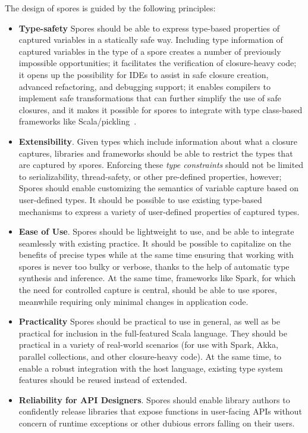 \documentclass{llncs}
\begin{document}
The design of spores is guided by the following principles:
\begin{itemize}
\item {\bf Type-safety} Spores should be able to express type-based
properties of captured variables in a statically safe way. Including type
information of captured variables in the type of a spore creates a number of
previously impossible opportunities; it facilitates the verification of
closure-heavy code; it opens up the possibility for IDEs to assist in safe
closure creation, advanced refactoring, and debugging support; it enables
compilers to implement safe transformations that can further simplify the use
of safe closures, and it makes it possible for spores to integrate with type
class-based frameworks like Scala/pickling~\cite{ScalaPickling}.

\item {\bf Extensibility}. Given types which include information about what  a
closure captures, libraries and frameworks should be able to restrict the
types that are captured by spores. Enforcing these {\em type constraints}
should not be limited to serializability, thread-safety, or other pre-defined
properties, however; Spores should enable customizing the semantics of
variable capture based on user-defined types. It should be possible to use
existing type-based mechanisms to express a variety of user-defined properties
of captured types.

\item {\bf Ease of Use}. Spores should be lightweight
to use, and be able to integrate seamlessly with existing practice. It should
be possible to capitalize on the benefits of precise types while at the same
time ensuring that working with spores is never too bulky or verbose, thanks
to the help of automatic type synthesis and inference. At the same time,
frameworks like Spark, for which the need for controlled capture is central,
should be able to use spores, meanwhile requiring only minimal changes in
application code.

\item {\bf Practicality} Spores should be practical to use in general, as
well as be practical for inclusion in the full-featured Scala language. They
should be practical in a variety of real-world scenarios (for use with Spark,
Akka, parallel collections, and other closure-heavy code). At the same time,
to enable a robust integration with the host language, existing type system
features should be reused instead of extended.

\item {\bf Reliability for API Designers}. Spores should enable library
authors to confidently release libraries that expose functions in user-facing
APIs without concern of runtime exceptions or other dubious errors falling on
their users.

\end{itemize}
\end{document}
